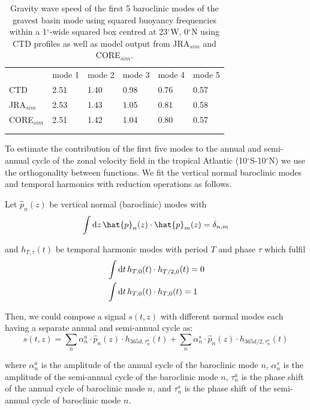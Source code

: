 \documentclass[os, manuscript]{copernicus}
\begin{document}
	\begin{table}[t]
		\caption{Gravity wave speed of the first 5 baroclinic modes of the gravest basin mode using squared buoyancy frequencies within a 1$^{\circ}$-wide squared box centred at 23$^{\circ}$W, 0$^{\circ}$N using CTD profiles as well as model output from JRA$_{sim}$ and CORE$_{sim}$.}
		\begin{tabular}{llllll}
			\tophline
			& mode 1 & mode 2 & mode 3 & mode 4 & mode 5 \\
			\middlehline
			CTD  & 2.51 & 1.40 & 0.98 & 0.76 & 0.57 \\
			JRA$_{sim}$  & 2.53 & 1.43 & 1.05 & 0.81 & 0.58 \\
			CORE$_{sim}$ & 2.51 & 1.42 & 1.04 & 0.80 & 0.57 \\
			\\
			\bottomhline
		\end{tabular}
		\label{tab_modes_c}
		\belowtable{ } %
	\end{table}
	
	To estimate the contribution of the first five modes to the annual and semi-annual cycle of the zonal velocity field in the tropical Atlantic (10$^{\circ}$S-10$^{\circ}$N) we use the orthogonality between functions. We fit the vertical normal baroclinic modes and temporal harmonics with reduction operations as follows.
	
	Let $\hat{p}_n(z)$ be vertical normal (baroclinic) modes with 
	\begin{equation}
		\int {\rm d}z\, \hat{p}_n(z) \cdot \hat{p}_m(z) = \delta_{n,m} 
	\end{equation}
	
	and $h_{T,\tau}(t)$ be temporal harmonic modes with period $T$ and phase $\tau$ which fulfil 
	\begin{align}
		&\int {\rm d}t\, h_{T,0}(t) \cdot h_{T/2,0}(t) = 0\\
		&\int {\rm d}t\, h_{T,0}(t) \cdot h_{T,0}(t) = 1
	\end{align}
	
	Then, we could compose a signal $s(t, z)$ with different normal modes each having a separate annual and semi-annual cycle as: 
	\begin{equation}
		s(t, z)= \sum_n \alpha^a_n \cdot \hat{p}_n(z) \cdot h_{365d, \tau^a_n}(t) + \sum_n \alpha^s_n \cdot \hat{p}_n(z) \cdot h_{365d/2, \tau^s_n}(t)
	\end{equation} 
	
	where $\alpha^a_n$ is the amplitude of the annual cycle of the baroclinic mode $n$, $\alpha^s_n$ is the amplitude of the semi-annual cycle of the baroclinic mode $n$, $\tau^a_n$ is the phase shift of the annual cycle of baroclinic mode $n$, and $\tau^s_n$ is the phase shift of the semi-annual cycle of baroclinic mode $n$. 
	
\end{document}
